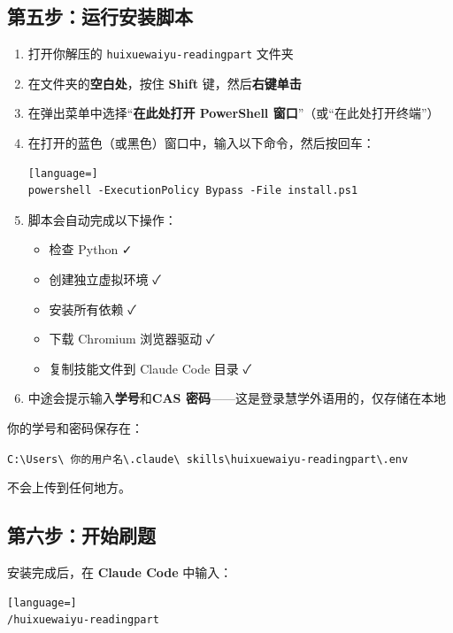 \documentclass[12pt,a4paper]{ctexart}
\begin{document}
\subsection{第五步：运行安装脚本}

\begin{enumerate}
  \item 打开你解压的 \texttt{huixuewaiyu-readingpart} 文件夹
  \item 在文件夹的\textbf{空白处}，按住 \textbf{Shift} 键，然后\textbf{右键单击}
  \item 在弹出菜单中选择``\textbf{在此处打开 PowerShell 窗口}''（或``在此处打开终端''）
  \item 在打开的蓝色（或黑色）窗口中，输入以下命令，然后按回车：
    \begin{lstlisting}[language=]
powershell -ExecutionPolicy Bypass -File install.ps1
\end{lstlisting}
  \item 脚本会自动完成以下操作：
    \begin{itemize}[nosep]
      \item 检查 Python \faCheck{}
      \item 创建独立虚拟环境 \faCheck{}
      \item 安装所有依赖 \faCheck{}
      \item 下载 Chromium 浏览器驱动 \faCheck{}
      \item 复制技能文件到 Claude Code 目录 \faCheck{}
    \end{itemize}
  \item 中途会提示输入\textbf{学号}和\textbf{CAS 密码}——这是登录慧学外语用的，仅存储在本地
\end{enumerate}

\begin{tipbox}
  你的学号和密码保存在：
  \begin{center}
    \texttt{C:\textbackslash Users\textbackslash
      你的用户名\textbackslash .claude\textbackslash
    skills\textbackslash huixuewaiyu-readingpart\textbackslash .env}
  \end{center}
  不会上传到任何地方。
\end{tipbox}

\subsection{第六步：开始刷题}

安装完成后，在 \textbf{Claude Code} 中输入：

\begin{lstlisting}[language=]
/huixuewaiyu-readingpart
\end{lstlisting}
\end{document}
